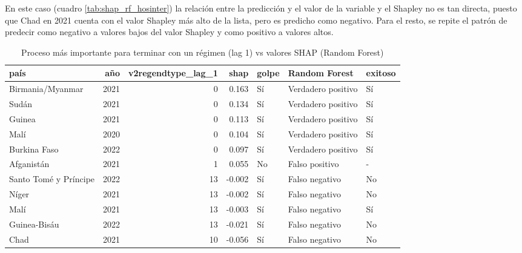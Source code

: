 \documentclass{article}
\begin{document}
En este caso (cuadro \ref{tab:shap_rf_hosinter}) la relación entre la predicción y el valor de la 
variable y el Shapley no es tan directa, puesto que Chad en 2021 cuenta con el valor Shapley más 
alto de la lista, pero es predicho como negativo. Para el resto, se repite el patrón de predecir 
como negativo a valores bajos del valor Shapley y como positivo a valores altos.

\begin{table}[H]
 \centering
 \begin{tabular}{lrrrlll}
  \toprule
  país & año & v2regendtype\_lag\_1 & shap & golpe & Random Forest & exitoso \\
  \midrule
  Birmania/Myanmar & 2021 & 0 & 0.163 & Sí & Verdadero positivo & Sí \\
  Sudán & 2021 & 0 & 0.134 & Sí & Verdadero positivo & Sí \\
  Guinea & 2021 & 0 & 0.113 & Sí & Verdadero positivo & Sí \\
  Malí & 2020 & 0 & 0.104 & Sí & Verdadero positivo & Sí \\
  Burkina Faso & 2022 & 0 & 0.097 & Sí & Verdadero positivo & Sí \\
  Afganistán & 2021 & 1 & 0.055 & No & Falso positivo & - \\
  Santo Tomé y Príncipe & 2022 & 13 & -0.002 & Sí & Falso negativo & No \\
  Níger & 2021 & 13 & -0.002 & Sí & Falso negativo & No \\
  Malí & 2021 & 13 & -0.003 & Sí & Falso negativo & Sí \\
  Guinea-Bisáu & 2022 & 13 & -0.021 & Sí & Falso negativo & No \\
  Chad & 2021 & 10 & -0.056 & Sí & Falso negativo & No \\
  \bottomrule
  \end{tabular}
\caption{Proceso más importante para terminar con un régimen (lag 1) vs valores 
     SHAP (Random Forest) \label{tab:shap_rf_regend}}
\end{table}
\end{document}
